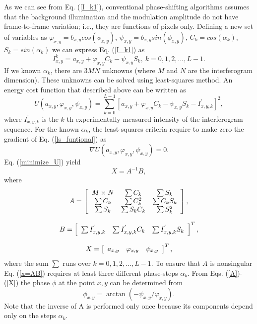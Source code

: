 \documentclass[letterpaper,12pt]{article}   %
\begin{document}
As we can see from Eq. (\ref{I_k1}), conventional phase-shifting algorithms assumes that
the background illumination and the modulation amplitude do not have frame-to-frame
variation; i.e., they are functions of pixels only. Defining a new set of variables as
$\varphi_{x,y}=b_{x,y}cos(\phi_{x,y})$, $\psi_{x,y}=b_{x,y}sin(\phi_{x,y})$,
$C_k=cos(\alpha_k)$, $S_k=sin(\alpha_k)$ we can express Eq. (\ref{I_k1}) as
\begin{equation}\label{I_k2}
	I_{x,y}^k=a_{x,y}+\varphi_{x,y}C_k-\psi_{x,y}S_k,\: k=0,1,2,...,L-1.
\end{equation}
If we known $\alpha_k$, there are $3MN$ unknowns (where $M$ and $N$ are the interferogram
dimension). These unknowns can be solved using least-squares method. An energy cost function that described above can be written as
\begin{equation}\label{ls_funtional}
	U(a_{x,y},\varphi_{x,y},\psi_{x,y})=\sum_{k=0}^{L-1}
	[a_{x,y}+\varphi_{x,y}C_k-\psi_{x,y}S_k-I_{x,y,k}^{'}]^2,
\end{equation}
where $I_{x,y,k}^{'}$ is the $k$-th experimentally measured intensity of the 
interferogram sequence. For the known $\alpha_k$, the least-squares criteria require to 
make zero the gradient of Eq. (\ref{ls_funtional}) as
\begin{equation}\label{minimize_U}
	\nabla U(a_{x,y},\varphi_{x,y},\psi_{x,y})=0.
\end{equation}
Eq. (\ref{minimize_U}) yield
\begin{equation}\label{x=AB}
	X = A^{-1} B,
\end{equation}
where
\begin{equation}\label{A}
	A = \left[ \begin{array}{c c c}
	M\times N & \sum C_k     & \sum S_k \\
	\sum C_k  & \sum C_k^2   & \sum C_k S_k \\
	\sum S_k  & \sum S_k C_k & \sum S_k^2\end{array} \right],
\end{equation}

\begin{equation}\label{B}
	B = \left[ \begin{array}{c c c}
	\sum I_{x,y,k}^{'} & \sum I_{x,y,k}^{'} C_k & \sum I_{x,y,k}^{'} S_k \end{array}
	\right]^T,
\end{equation}

\begin{equation}\label{X}
	X = \left[ \begin{array}{c c c}
	a_{x,y} & \varphi_{x,y} & \psi_{x,y} \end{array} \right]^T,
\end{equation}
where the sum $\sum$ runs over $k=0,1,2,...,L-1$. To ensure that $A$ is nonsingular Eq.
(\ref{x=AB}) requires at least three different phase-steps $\alpha_k$. From Eqs.
(\ref{A})-(\ref{X}) the phase $\phi$ at the point $x,y$ can be determined from
\begin{equation}
	\phi_{x,y} = \arctan(-\psi_{x,y}/\varphi_{x,y}).
\end{equation}
Note that the inverse of A is performed only once because its components depend only on
the steps $\alpha_k$.
\end{document}

